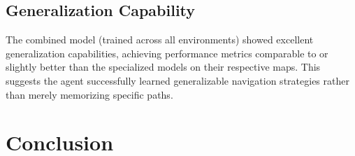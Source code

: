 \subsection{Generalization Capability}
The combined model (trained across all environments) showed excellent generalization capabilities, achieving performance metrics comparable to or slightly better than the specialized models on their respective maps. 
This suggests the agent successfully learned generalizable navigation strategies rather than merely memorizing specific paths.

\section{Conclusion}
